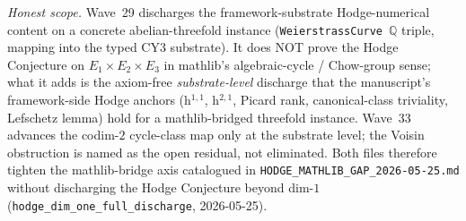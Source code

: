 \begin{remark}
\begin{itemize}
\end{itemize}

\emph{Honest scope.} Wave~29 discharges the framework-substrate Hodge-numerical content on a concrete abelian-threefold instance (\texttt{WeierstrassCurve}~$\mathbb{Q}$ triple, mapping into the typed CY3 substrate). It does NOT prove the Hodge Conjecture on $E_1 \times E_2 \times E_3$ in mathlib's algebraic-cycle / Chow-group sense; what it adds is the axiom-free \emph{substrate-level} discharge that the manuscript's framework-side Hodge anchors (h$^{1,1}$, h$^{2,1}$, Picard rank, canonical-class triviality, Lefschetz lemma) hold for a mathlib-bridged threefold instance. Wave~33 advances the codim-$2$ cycle-class map only at the substrate level; the Voisin obstruction is named as the open residual, not eliminated. Both files therefore tighten the mathlib-bridge axis catalogued in \texttt{HODGE\_MATHLIB\_GAP\_2026-05-25.md} without discharging the Hodge Conjecture beyond dim-$1$ (\texttt{hodge\_dim\_one\_full\_discharge}, 2026-05-25).
\end{remark}

